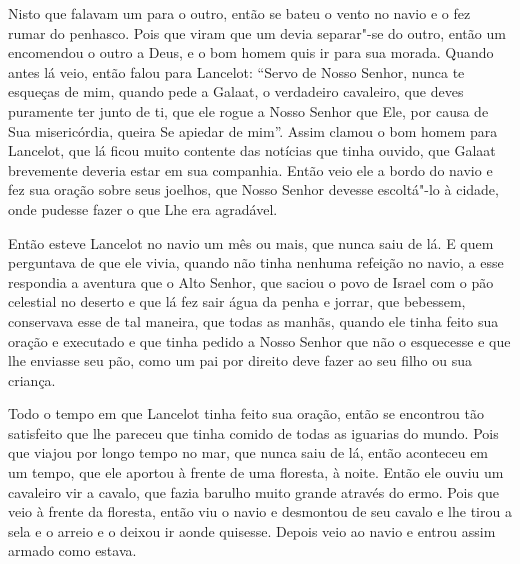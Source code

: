 Nisto que falavam um para o outro, então se bateu o vento no navio e o fez rumar
do penhasco. Pois que viram que um devia separar"-se do outro, então um
encomendou o outro a Deus, e o bom homem quis ir para sua morada. Quando antes
lá veio, então falou para Lancelot: “Servo de Nosso Senhor, nunca te esqueças
de mim, quando pede a Galaat, o verdadeiro cavaleiro, que deves puramente ter
junto de ti, que ele rogue a Nosso Senhor que Ele, por causa de Sua
misericórdia, queira Se apiedar de mim”. Assim clamou o bom homem para
Lancelot, que lá ficou muito contente das notícias que tinha ouvido, que
Galaat brevemente deveria estar em sua companhia. Então veio ele a bordo do
navio e fez sua oração sobre seus joelhos, que Nosso Senhor devesse escoltá"-lo
à cidade, onde pudesse fazer o que Lhe era agradável. 

Então esteve Lancelot no navio um mês ou mais, que nunca saiu de lá. E quem
perguntava de que ele vivia, quando não tinha nenhuma refeição no navio, a esse
respondia a aventura que o Alto Senhor, que saciou o povo de Israel com o pão
celestial no deserto e que lá fez sair água da penha e jorrar, que bebessem,
conservava esse de tal maneira, que todas as manhãs, quando ele tinha feito sua
oração e executado e que tinha pedido a Nosso Senhor que não o esquecesse e que
lhe enviasse seu pão, como um pai por direito deve fazer ao seu filho ou sua
criança.

Todo o tempo em que Lancelot tinha feito sua oração, então se encontrou tão
satisfeito que lhe pareceu que tinha comido de todas as iguarias do mundo. Pois
que viajou por longo tempo no mar, que nunca saiu de lá, então aconteceu em um
tempo, que ele aportou à frente de uma floresta, à noite. Então ele ouviu um
cavaleiro vir a cavalo, que fazia barulho muito grande através do ermo. Pois
que veio à frente da floresta, então viu o navio e desmontou de seu cavalo e
lhe tirou a sela e o arreio e o deixou ir aonde quisesse. Depois veio ao navio
e entrou assim armado como estava.

